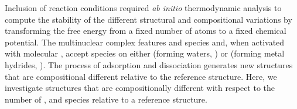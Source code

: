\documentclass[journal=jctcce,manuscript=article]{achemso}
\begin{document}
Inclusion of reaction conditions required \textit{ab initio} thermodynamic analysis to compute the stability of the different structural and compositional variations by transforming the free energy from a fixed number of atoms to a fixed chemical potential. The multinuclear  complex features  and  species and, when activated with molecular , accept  species on either  (forming waters, ) or  (forming metal hydrides, ). The process of  adsorption and dissociation generates new structures that are compositional different relative to the reference structure. Here, we investigate structures that are compositionally different with respect to the number of ,  and  species relative to a reference structure. 
\end{document}
